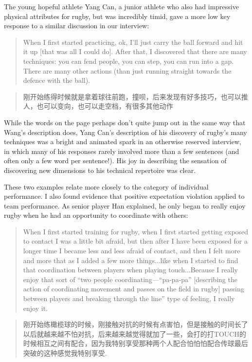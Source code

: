 \begin{CJK}{UTF8}{gbsn}
The young hopeful athlete Yang Can, a junior athlete who also had impressive physical attributes for rugby, but was incredibly timid, gave a more low key response to a similar discussion in our interview:

    \begin{quote}
      When I first started practicing, ok, I'll just carry the ball forward and hit it up [that was all I could do]. After that, I discovered that there are many techniques: you can fend people, you can step, you can run into a gap. There are many other actions (than just running straight towards the defence with the ball).
    \end{quote}

    \begin{quote}
      刚开始练得时候就是拿着球往前跑，撞呗，后来发现有好多技巧，也可以推人，也可以变向，也可以走空档，有很多其他动作
    \end{quote}

While the words on the page perhaps don't quite jump out in the same way that Wang's description does, Yang Can's description of his discovery of rugby's many techniques was a bright and animated spark in an otherwise reserved interview, in which many of his responses rarely involved more than a few sentences (and often only a few word per sentence!).  His joy in describing the sensation of discovering new dimensions to his technical repertoire was clear.

These two examples relate more closely to the category of individual performance.  I also found evidence that positive expectation violation applied to team performance.  As senior player Han explained, he only began to really enjoy rugby when he had an opportunity to coordinate with others:

\begin{quote}
    When I first started training for rugby, when I first started getting exposed to contact I was a little bit afraid, but then after I have been exposed for a longer time I became less and less afraid of contact, and then I felt more and more that as I added a few more things...like when I started to find that coordination between players when playing touch...Because I really enjoy that sort of ``two people coordinating---``pa-pa-pa'' [describing the action of coordinating movement and passes on the field in rugby] passing between players and breaking through the line'' type of feeling, I really enjoy it.
\end{quote}

\begin{quote}
      刚开始练橄榄球的时候，刚接触对抗的时候有点害怕，但是接触的时间长了以后就越来越不怕对抗，后来越来越觉得就加了一些，会打的打TOUCH的时候相互之间有配合，因为我特别享受那种两个人配合怕怕怕配合传球最后突破的这种感觉我特别享受.
\end{quote}


\end{CJK}
